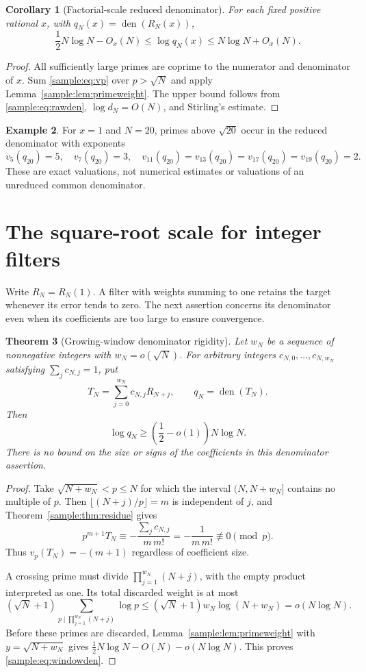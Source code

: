 \documentclass[11pt,a4paper]{article}
\DeclareMathOperator{\den}{den}
\newtheorem{theorem}{Theorem}[section]
\newtheorem{corollary}[theorem]{Corollary}
\theoremstyle{definition}
\newtheorem{example}[theorem]{Example}
\theoremstyle{remark}
\numberwithin{equation}{section}
\begin{document}
\begin{corollary}[Factorial-scale reduced denominator]\label{sample:cor:den}
For each fixed positive rational $x$, with $q_N(x)=\den(R_N(x))$,
\begin{equation}\label{sample:eq:denbound}
\frac12N\log N-O_x(N)
\le\log q_N(x)\le N\log N+O_x(N).
\end{equation}
\end{corollary}
\begin{proof}
All sufficiently large primes are coprime to the numerator and denominator
of $x$. Sum \eqref{sample:eq:vp} over $p>\sqrt N$ and apply
Lemma~\ref{sample:lem:primeweight}. The upper bound follows from
\eqref{sample:eq:rawden}, $\log d_N=O(N)$, and Stirling's estimate.
\end{proof}

\begin{example}
For $x=1$ and $N=20$, primes above $\sqrt{20}$ occur in the reduced denominator
with exponents
\[
v_5(q_{20})=5,\quad v_7(q_{20})=3,\quad
v_{11}(q_{20})=v_{13}(q_{20})=v_{17}(q_{20})=v_{19}(q_{20})=2.
\]
These are exact valuations, not numerical estimates or valuations of an
unreduced common denominator.
\end{example}

\section{The square-root scale for integer filters}
\label{sample:sec:filters}
Write $R_N=R_N(1)$. A filter with weights summing to one retains the
target whenever its error tends to zero. The next assertion concerns its
denominator even when its coefficients are too large to ensure convergence.

\begin{theorem}[Growing-window denominator rigidity]\label{sample:thm:window}
Let $w_N$ be a sequence of nonnegative integers with $w_N=o(\sqrt N)$.
For arbitrary integers $c_{N,0},\ldots,c_{N,w_N}$ satisfying
$\sum_jc_{N,j}=1$, put
\[
T_N=\sum_{j=0}^{w_N}c_{N,j}R_{N+j},\qquad q_N=\den(T_N).
\]
Then
\begin{equation}\label{sample:eq:windowden}
\log q_N\ge\left(\frac12-o(1)\right)N\log N.
\end{equation}
There is no bound on the size or signs of the coefficients in this
denominator assertion.
\end{theorem}
\begin{proof}
Take $\sqrt{N+w_N}<p\le N$ for which the interval
$(N,N+w_N]$ contains no multiple of $p$. Then
$\lfloor(N+j)/p\rfloor=m$ is independent of $j$, and
Theorem~\ref{sample:thm:residue} gives
\[
p^{m+1}T_N\equiv-\frac{\sum_jc_{N,j}}{m\,m!}
=-\frac1{m\,m!}\not\equiv0\pmod p.
\]
Thus $v_p(T_N)=-(m+1)$ regardless of coefficient size.

A crossing prime must divide
$\prod_{j=1}^{w_N}(N+j)$, with the empty product interpreted as one.
Its total discarded weight is at most
\[
(\sqrt N+1)\sum_{p\mid\prod_{j=1}^{w_N}(N+j)}\log p
\le(\sqrt N+1)w_N\log(N+w_N)=o(N\log N).
\]
Before these primes are discarded,
Lemma~\ref{sample:lem:primeweight} with $y=\sqrt{N+w_N}$ gives
$\frac12N\log N-O(N)-o(N\log N)$. This proves
\eqref{sample:eq:windowden}.
\end{proof}
\end{document}
